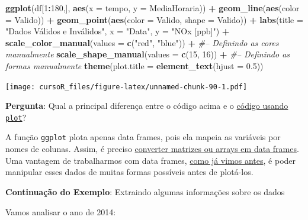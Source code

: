 \documentclass[]{book}
\newenvironment{Shaded}{\begin{snugshade}}{\end{snugshade}}
\newcommand{\KeywordTok}[1]{\textcolor[rgb]{0.13,0.29,0.53}{\textbf{#1}}}
\newcommand{\DataTypeTok}[1]{\textcolor[rgb]{0.13,0.29,0.53}{#1}}
\newcommand{\DecValTok}[1]{\textcolor[rgb]{0.00,0.00,0.81}{#1}}
\newcommand{\FloatTok}[1]{\textcolor[rgb]{0.00,0.00,0.81}{#1}}
\newcommand{\StringTok}[1]{\textcolor[rgb]{0.31,0.60,0.02}{#1}}
\newcommand{\CommentTok}[1]{\textcolor[rgb]{0.56,0.35,0.01}{\textit{#1}}}
\newcommand{\OperatorTok}[1]{\textcolor[rgb]{0.81,0.36,0.00}{\textbf{#1}}}
\newcommand{\NormalTok}[1]{#1}
\theoremstyle{definition}
\theoremstyle{definition}
\theoremstyle{definition}
\theoremstyle{remark}
\begin{document}
\begin{Shaded}
\begin{Highlighting}[]
\KeywordTok{ggplot}\NormalTok{(df[}\DecValTok{1}\OperatorTok{:}\DecValTok{180}\NormalTok{,], }\KeywordTok{aes}\NormalTok{(}\DataTypeTok{x =}\NormalTok{ tempo, }\DataTypeTok{y =}\NormalTok{ MediaHoraria)) }\OperatorTok{+}\StringTok{ }
\StringTok{  }\KeywordTok{geom_line}\NormalTok{(}\KeywordTok{aes}\NormalTok{(}\DataTypeTok{color =}\NormalTok{ Valido)) }\OperatorTok{+}
\StringTok{  }\KeywordTok{geom_point}\NormalTok{(}\KeywordTok{aes}\NormalTok{(}\DataTypeTok{color =}\NormalTok{ Valido, }\DataTypeTok{shape =}\NormalTok{ Valido)) }\OperatorTok{+}
\StringTok{  }\KeywordTok{labs}\NormalTok{(}\DataTypeTok{title =} \StringTok{"Dados Válidos e Inválidos"}\NormalTok{, }\DataTypeTok{x =} \StringTok{"Data"}\NormalTok{, }\DataTypeTok{y =} \StringTok{"NOx [ppb]"}\NormalTok{) }\OperatorTok{+}
\StringTok{  }\KeywordTok{scale_color_manual}\NormalTok{(}\DataTypeTok{values =} \KeywordTok{c}\NormalTok{(}\StringTok{"red"}\NormalTok{, }\StringTok{"blue"}\NormalTok{)) }\OperatorTok{+}\StringTok{ }\CommentTok{#-- Definindo as cores manualmente}
\StringTok{  }\KeywordTok{scale_shape_manual}\NormalTok{(}\DataTypeTok{values =} \KeywordTok{c}\NormalTok{(}\DecValTok{15}\NormalTok{, }\DecValTok{16}\NormalTok{)) }\OperatorTok{+}\StringTok{ }\CommentTok{#-- Definindo as formas manualmente}
\StringTok{  }\KeywordTok{theme}\NormalTok{(}\DataTypeTok{plot.title =} \KeywordTok{element_text}\NormalTok{(}\DataTypeTok{hjust =} \FloatTok{0.5}\NormalTok{))}
\end{Highlighting}
\end{Shaded}

\texttt{[image: cursoR\_files/figure-latex/unnamed-chunk-90-1.pdf]}

{\textbf{Pergunta}: Qual a principal diferença entre o código acima e o
\protect\hyperlink{plot_base}{código usando \texttt{plot}}?}

A função \texttt{ggplot} plota apenas data frames, pois ela mapeia as
variáveis por nomes de colunas. Assim, é preciso
\protect\hyperlink{convert_df}{converter matrizes ou arrays em data
frames}.\\
Uma vantagem de trabalharmos com data frames,
\protect\hyperlink{processing_dfs}{como já vimos antes}, é poder
manipular esses dados de muitas formas possíveis antes de plotá-los.

\textbf{Continuação do Exemplo}: Extraindo algumas informações sobre os
dados

Vamos analisar o ano de 2014:
\end{document}
